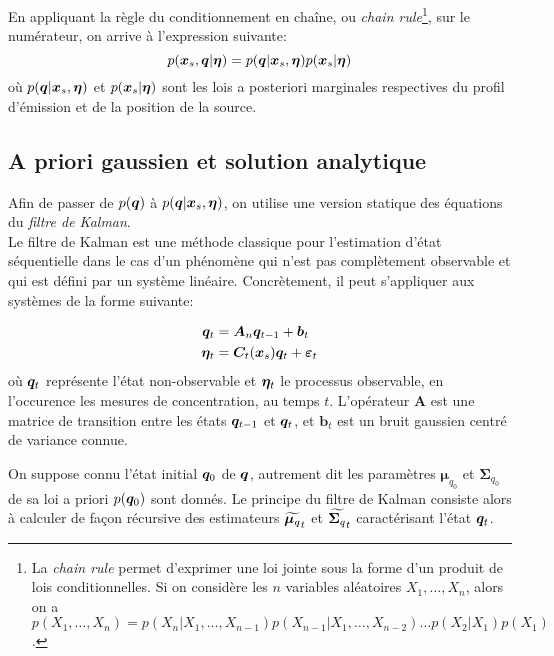 En appliquant la règle du conditionnement en chaîne, ou \textit{chain rule}\footnote{La \textit{chain rule} permet d'exprimer une loi jointe sous la forme d'un produit de lois conditionnelles. Si on considère les $n$ variables aléatoires $X_1, \dots, X_n$, alors on a $p(X_1, \dots, X_n) = p(X_n|X_1, \dots, X_{n-1})p(X_{n-1}|X_1, \dots, X_{n-2})\dots p(X_2|X_1)p(X_1)$.}, sur le numérateur, on arrive à l'expression suivante:
\begin{equation}
p({\bm{x}_s}, {\bm{q}} | {\bm{\eta}}) = p({\bm{q}} | {\bm{x}_s}, {\bm{\eta}})p({\bm{x}_s} | {\bm{\eta}})
\label{eq_AE_9}
\end{equation}
où $p({\bm{q}} | {\bm{x}_s}, {\bm{\eta}})$ et $p({\bm{x}_s} | {\bm{\eta}})$ sont les lois a posteriori marginales respectives du profil d'émission et de la position de la source. \\

\subsection{A priori gaussien et solution analytique}

Afin de passer de $p({\bm{q}})$ à $p({\bm{q}} |{\bm{x}_s}, {\bm{\eta}})$, on utilise une version statique des équations du \textit{filtre de Kalman}.\\

Le filtre de Kalman \cite{Kalman1961} est une méthode classique pour l'estimation d'état séquentielle dans le cas d'un phénomène qui n'est pas complètement observable et qui est défini par un système linéaire. Concrètement, il peut s'appliquer aux systèmes de la forme suivante:

\begin{equation}
\begin{split}
{\bm{q}}_t & = \bm{A}_n{\bm{q}}_{t-1} + \bm{b}_t\\
{\bm{\eta}}_t & = {\bm{C}}_t({\bm{x}_s}) {\bm{q}}_t + {\bm{\varepsilon}}_t
\end{split}
\label{eq_filtre_kalman_dynamique}
\end{equation}
où ${\bm{q}}_t$ représente l'état non-observable et ${\bm{\eta}}_t$ le processus observable, en l'occurence les mesures de concentration, au temps $t$. L'opérateur $\bm{A}$ est une matrice de transition entre les états ${\bm{q}}_{t-1}$ et ${\bm{q}}_t$, et $\bm{b}_t$ est un bruit gaussien centré de variance connue.

 On suppose connu l'état initial ${\bm{q}}_0$ de ${\bm{q}}$,  autrement dit les paramètres $\bm{\mu}_{q_{0}}$ et $\bm{\Sigma}_{q_0}$ de sa loi a priori $p({\bm{q}}_0)$ sont donnés. Le principe du filtre de Kalman consiste alors à calculer de façon récursive des estimateurs ${\widetilde{{\bm{\mu}_q}}}_t$ et ${\widetilde{{\bm{\Sigma}_q}}}_t$ caractérisant l'état ${\bm{q}}_t$.\\
 
